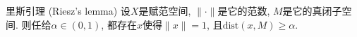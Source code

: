 
\begin{lemma}{里斯引理 (Riesz's lemma)}
设$X$是赋范空间, $\|\cdot\|$是它的范数, $M$是它的真闭子空间. 则任给$\alpha\in(0,1)$, 都存在$x$使得$\|x\|=1$, 且$\text{dist}(x,M)\geq\alpha$.
\end{lemma}